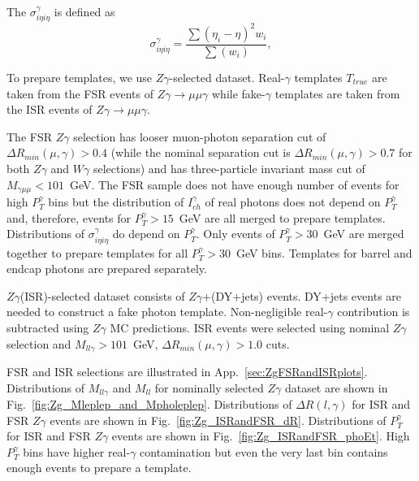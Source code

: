 The $\sigma_{i\eta i\eta}^{\gamma}$ is defined as
\begin{equation}
  \sigma_{i\eta i\eta}^{\gamma} = \frac{\sum{(\eta_i-\eta)^2 w_i}}{\sum(w_i)},
\end{equation}

To prepare templates, we use $Z\gamma$-selected dataset. Real-$\gamma$ templates $T_{true}$ are taken from the FSR events of $Z\gamma\rightarrow\mu\mu\gamma$ while fake-$\gamma$ templates are taken from the ISR events of $Z\gamma\rightarrow\mu\mu\gamma$.

The FSR $Z\gamma$ selection has looser muon-photon separation cut of $\Delta R_{min}(\mu,\gamma)>0.4$ (while the nominal separation cut is $\Delta R_{min}(\mu,\gamma)>0.7$ for both $Z\gamma$ and $W\gamma$ selections) and has three-particle invariant mass cut of $M_{\gamma\mu\mu}<101$~GeV. The FSR sample does not have enough number of events for high $P_{T}^{\gamma}$ bins but the distribution of $I_{ch}^{\gamma}$ of real photons does not depend on $P_{T}^{\gamma}$ and, therefore, events for $P_{T}^{\gamma}>15$~GeV are all merged to prepare templates. Distributions of $\sigma_{i\eta i\eta}^{\gamma}$ do depend on $P_T^{\gamma}$. Only events of $P_T^{\gamma}>30$~GeV are merged together to prepare templates for all $P_T^{\gamma}>30$~GeV bins. Templates for barrel and endcap photons are prepared separately.

$Z\gamma$(ISR)-selected dataset consists of $Z\gamma$+(DY+jets) events. DY+jets events are needed to construct a fake photon template. Non-negligible real-$\gamma$ contribution is subtracted using $Z\gamma$ MC predictions. ISR events were selected using nominal $Z\gamma$ selection and $M_{ll\gamma}>101$~GeV, $\Delta{R_{min}}(\mu,\gamma)>1.0$ cuts. 

FSR and ISR selections are illustrated in App.~\ref{sec:ZgFSRandISRplots}. Distributions of $M_{ll\gamma}$ and $M_{ll}$ for nominally selected $Z\gamma$ dataset are shown in Fig.~\ref{fig:Zg_Mleplep_and_Mpholeplep}. Distributions of $\Delta{R}(l,\gamma)$ for ISR and FSR $Z\gamma$ events are shown in Fig.~\ref{fig:Zg_ISRandFSR_dR}. Distributions of $P_{T}^{\gamma}$ for ISR and FSR $Z\gamma$ events are shown in Fig.~\ref{fig:Zg_ISRandFSR_phoEt}. High $P_{T}^{\gamma}$ bins have higher real-$\gamma$ contamination but even the very last bin contains enough events to prepare a template. 

